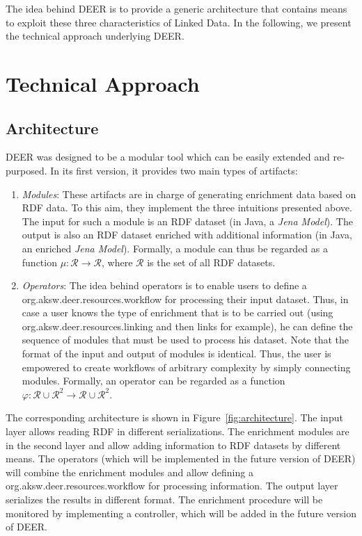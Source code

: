 \documentclass[a4paper,twoside,bibtotoc,abstracton,12pt,BCOR=15mm]{article}
\newcommand{\geolift}{\textsc{DEER}\xspace}
\begin{document}
The idea behind \geolift is to provide a generic architecture that contains means to exploit these three characteristics of Linked Data. 
In the following, we present the technical approach underlying \geolift.

\section{Technical Approach}
\subsection{Architecture}
\geolift was designed to be a modular tool which can be easily extended and re-purposed.
In its first version, it provides two main types of artifacts:
\begin{enumerate}
\item \emph{Modules}: These artifacts are in charge of generating enrichment data based on RDF data. 
To this aim, they implement the three intuitions presented above.
The input for such a module is an RDF dataset (in Java, a \emph{Jena Model}).
The output is also an RDF dataset enriched with additional information (in Java, an enriched \emph{Jena Model}).
Formally, a module can thus be regarded as a function $\mu: \mathcal{R} \rightarrow \mathcal{R}$, where $\mathcal{R}$ is the set of all RDF datasets.
\item \emph{Operators}: The idea behind operators is to enable users to define a org.aksw.deer.resources.workflow for processing their input dataset.
Thus, in case a user knows the type of enrichment that is to be carried out (using org.aksw.deer.resources.linking and then links for example), he can define the sequence of modules that must be used to process his dataset.
Note that the format of the input and output of modules is identical. 
Thus, the user is empowered to create workflows of arbitrary complexity by simply connecting modules.
Formally, an operator can be regarded as a function $\varphi: \mathcal{R} \cup \mathcal{R}^2 \rightarrow \mathcal{R} \cup \mathcal{R}^2$.
\end{enumerate}
The corresponding architecture is shown in Figure~\ref{fig:architecture}. The input layer allows reading RDF in different serializations.
The enrichment modules are in the second layer and allow adding information to RDF datasets by different means.
The operators (which will be implemented in the future version of \geolift) will combine the enrichment modules and allow defining a org.aksw.deer.resources.workflow for processing information.
The output layer serializes the results in different format.
The enrichment procedure will be monitored by implementing a controller, which will be added in the future version of \geolift.
\end{document}
